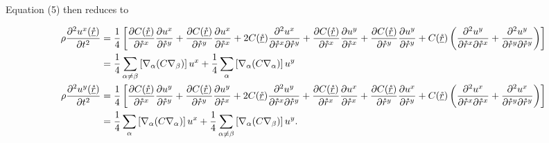 \documentclass[twoside,twocolumn,9pt]{article}
\begin{document}
Equation (5) then reduces to
\begin{strip}
\begin{align}
\rho\frac{\partial^2 u^x(\underline{\mathring{r}})}{\partial t^2}&=\frac{1}{4}\left[\frac{\partial C(\underline{\mathring{r}})}{\partial\mathring{r}^x}\frac{\partial u^x}{\partial\mathring{r}^y}+\frac{\partial C(\underline{\mathring{r}})}{\partial\mathring{r}^y}\frac{\partial u^x}{\partial\mathring{r}^x}+2C(\underline{\mathring{r}})\frac{\partial^2 u^x}{\partial\mathring{r}^x\partial\mathring{r}^y}+\frac{\partial C(\underline{\mathring{r}})}{\partial\mathring{r}^x}\frac{\partial u^y}{\partial\mathring{r}^x}+\frac{\partial
C(\underline{\mathring{r}})}{\partial\mathring{r}^y}\frac{\partial u^y}{\partial\mathring{r}^y}+C(\underline{\mathring{r}})\left(\frac{\partial^2u^y}{\partial\mathring{r}^{x}\partial\mathring{r}^{x}}+\frac{\partial^2u^y}{\partial\mathring{r}^{y}\partial\mathring{r}^{y}}\right)\right]\notag\\
&=\frac{1}{4}\sum_{\alpha\neq \beta}\left[\nabla_\alpha(C\nabla_\beta)\right]u^x+\frac{1}{4}\sum_\alpha\left[\nabla_\alpha(C\nabla_\alpha)\right]u^y\notag\\
\rho\frac{\partial^2 u^y(\underline{\mathring{r}})}{\partial t^2}&=\frac{1}{4}\left[\frac{\partial C(\underline{\mathring{r}})}{\partial\mathring{r}^x}\frac{\partial u^y}{\partial\mathring{r}^y}+\frac{\partial C(\underline{\mathring{r}})}{\partial\mathring{r}^y}\frac{\partial u^y}{\partial\mathring{r}^x}+2C(\underline{\mathring{r}})\frac{\partial^2 u^y}{\partial\mathring{r}^x\partial\mathring{r}^y}+\frac{\partial C(\underline{\mathring{r}})}{\partial\mathring{r}^x}\frac{\partial u^x}{\partial\mathring{r}^x}+\frac{\partial
C(\underline{\mathring{r}})}{\partial\mathring{r}^y}\frac{\partial u^x}{\partial\mathring{r}^y}+C(\underline{\mathring{r}})\left(\frac{\partial^2u^x}{\partial\mathring{r}^{x}\partial\mathring{r}^{x}}+\frac{\partial^2u^x}{\partial\mathring{r}^{y}\partial\mathring{r}^{y}}\right)\right]\notag\\
&=\frac{1}{4}\sum_\alpha\left[\nabla_\alpha(C\nabla_\alpha)\right]u^x+\frac{1}{4}\sum_{\alpha\neq \beta}\left[\nabla_\alpha(C\nabla_\beta)\right]u^y.
\end{align}
\end{strip}
\end{document}
